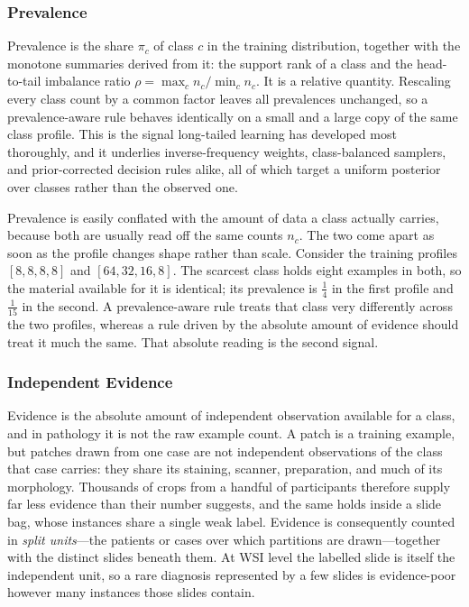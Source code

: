 \documentclass[11pt]{article}
\begin{document}
\subsubsection{Prevalence}
Prevalence is the share $\pi_c$ of class $c$ in the training distribution, together with the monotone summaries derived from it: the support rank of a class and the head-to-tail imbalance ratio $\rho=\max_c n_c/\min_c n_c$. It is a relative quantity. Rescaling every class count by a common factor leaves all prevalences unchanged, so a prevalence-aware rule behaves identically on a small and a large copy of the same class profile. This is the signal long-tailed learning has developed most thoroughly, and it underlies inverse-frequency weights, class-balanced samplers, and prior-corrected decision rules alike, all of which target a uniform posterior over classes rather than the observed one.

Prevalence is easily conflated with the amount of data a class actually carries, because both are usually read off the same counts $n_c$. The two come apart as soon as the profile changes shape rather than scale. Consider the training profiles $[8,8,8,8]$ and $[64,32,16,8]$. The scarcest class holds eight examples in both, so the material available for it is identical; its prevalence is $\tfrac{1}{4}$ in the first profile and $\tfrac{1}{15}$ in the second. A prevalence-aware rule treats that class very differently across the two profiles, whereas a rule driven by the absolute amount of evidence should treat it much the same. That absolute reading is the second signal.

\subsubsection{Independent Evidence}
Evidence is the absolute amount of independent observation available for a class, and in pathology it is not the raw example count. A patch is a training example, but patches drawn from one case are not independent observations of the class that case carries: they share its staining, scanner, preparation, and much of its morphology. Thousands of crops from a handful of participants therefore supply far less evidence than their number suggests, and the same holds inside a slide bag, whose instances share a single weak label. Evidence is consequently counted in \emph{split units}---the patients or cases over which partitions are drawn---together with the distinct slides beneath them. At WSI level the labelled slide is itself the independent unit, so a rare diagnosis represented by a few slides is evidence-poor however many instances those slides contain.
\end{document}
